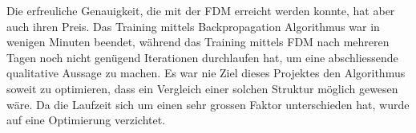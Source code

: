 Die erfreuliche Genauigkeit, die mit der FDM erreicht werden konnte,
hat aber auch ihren Preis.
Das Training mittels Backpropagation Algorithmus war in wenigen
Minuten beendet, während das Training mittels FDM nach mehreren
Tagen noch nicht genügend Iterationen durchlaufen hat, um eine
abschliessende qualitative Aussage zu machen.
Es war nie Ziel dieses Projektes den Algorithmus soweit zu optimieren,
dass ein Vergleich einer solchen Struktur möglich gewesen wäre.
Da die Laufzeit sich um einen sehr grossen Faktor unterschieden
hat, wurde auf eine Optimierung verzichtet.
